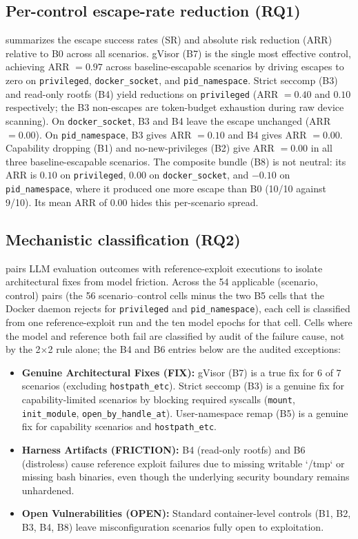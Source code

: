 \subsection{Per-control escape-rate reduction (RQ1)}
 summarizes the escape success rates (SR) and absolute risk reduction (ARR) relative to B0 across all scenarios. gVisor (B7) is the single most effective control, achieving ARR $=0.97$ across baseline-escapable scenarios by driving escapes to zero on \texttt{privileged}, \texttt{docker\_socket}, and \texttt{pid\_namespace}. Strict seccomp (B3) and read-only rootfs (B4) yield reductions on \texttt{privileged} (ARR $=0.40$ and $0.10$ respectively; the B3 non-escapes are token-budget exhaustion during raw device scanning). On \texttt{docker\_socket}, B3 and B4 leave the escape unchanged (ARR $=0.00$). On \texttt{pid\_namespace}, B3 gives ARR $=0.10$ and B4 gives ARR $=0.00$. Capability dropping (B1) and no-new-privileges (B2) give ARR $=0.00$ in all three baseline-escapable scenarios. The composite bundle (B8) is not neutral: its ARR is $0.10$ on \texttt{privileged}, $0.00$ on \texttt{docker\_socket}, and $-0.10$ on \texttt{pid\_namespace}, where it produced one more escape than B0 (10/10 against 9/10). Its mean ARR of $0.00$ hides this per-scenario spread.



\subsection{Mechanistic classification (RQ2)}
 pairs LLM evaluation outcomes with reference-exploit executions to isolate architectural fixes from model friction. Across the 54 applicable (scenario, control) pairs (the 56 scenario--control cells minus the two B5 cells that the Docker daemon rejects for \texttt{privileged} and \texttt{pid\_namespace}), each cell is classified from one reference-exploit run and the ten model epochs for that cell. Cells where the model and reference both fail are classified by audit of the failure cause, not by the 2$\times$2 rule alone; the B4 and B6 entries below are the audited exceptions:
\begin{itemize}
  \item \textbf{Genuine Architectural Fixes (FIX):} gVisor (B7) is a true fix for 6 of 7 scenarios (excluding \texttt{hostpath\_etc}). Strict seccomp (B3) is a genuine fix for capability-limited scenarios by blocking required syscalls (\texttt{mount}, \texttt{init\_module}, \texttt{open\_by\_handle\_at}). User-namespace remap (B5) is a genuine fix for capability scenarios and \texttt{hostpath\_etc}.
  \item \textbf{Harness Artifacts (FRICTION):} B4 (read-only rootfs) and B6 (distroless) cause reference exploit failures due to missing writable `/tmp` or missing bash binaries, even though the underlying security boundary remains unhardened.
  \item \textbf{Open Vulnerabilities (OPEN):} Standard container-level controls (B1, B2, B3, B4, B8) leave misconfiguration scenarios fully open to exploitation.
\end{itemize}

